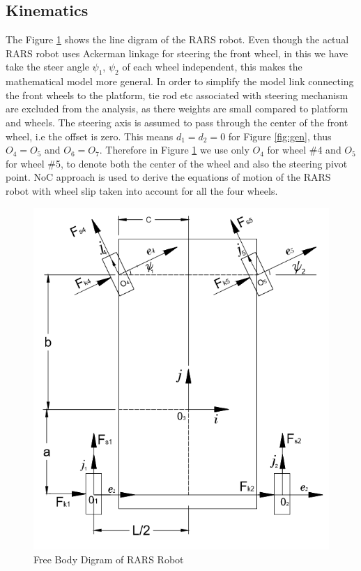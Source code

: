 {\subsection{Kinematics}
\label{sec:slipKina}
The Figure \ref{fig:VehicleWithSlip}  shows the line digram of the RARS robot. Even though the actual RARS robot uses Ackerman linkage for steering the front wheel, in this we have take the steer angle $\psi_1$, $\psi_2$ of each wheel independent, this makes the mathematical  model more general. In order to simplify the model  link connecting the front wheels to the platform, tie rod etc associated with steering mechanism   are excluded from the analysis, as there weights are small compared to platform and wheels. The steering axis is assumed to pass through the center of the front wheel, i.e the offset is zero.  This means $d_1=d_2=0$  for Figure \ref{fig:gen}, thus $O_4=O_5$ and $O_6=O_7$. Therefore in Figure \ref{fig:VehicleWithSlip} we use only $O_4$  for wheel \#4 and $O_5$ for wheel \#5, to denote both the center of the wheel and also the steering pivot point. NoC approach is used to derive the equations of motion of the RARS robot with wheel slip taken into account for all the four wheels.
\begin{figure}
	\centering
	\includegraphics[width=\linewidth]{Chapter4/fig/VechileWithSlip}
	\caption{Free Body Digram of RARS Robot}
	\label{fig:VehicleWithSlip}
\end{figure}

}
